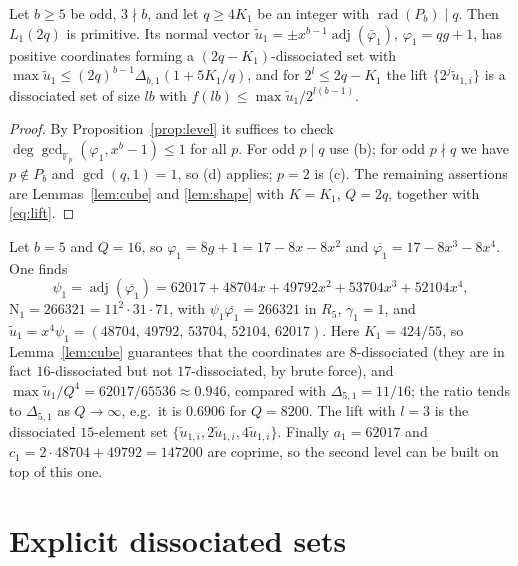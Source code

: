 \documentclass[12pt]{article}
\newcommand{\F}{\mathbb{F}}
\newcommand{\adj}{\operatorname{adj}}
\newcommand{\rad}{\operatorname{rad}}
\newcommand{\Nm}{\mathrm{N}}
\newcommand{\gpoly}{g}
\begin{document}
\begin{theorem}\label{thm:A}
Let $b\ge5$ be odd, $3\nmid b$, and let $q\ge4K_1$ be an integer with $\rad(P_b)\mid q$. Then $L_1(2q)$ is primitive.
Its normal vector $\tilde u_1=\pm x^{b-1}\adj(\bar\varphi_1)$, $\varphi_1=q\gpoly+1$, has positive coordinates forming a
$(2q-K_1)$-dissociated set with $\max\tilde u_1\le(2q)^{b-1}\Delta_{b,1}(1+5K_1/q)$, and for $2^l\le2q-K_1$ the lift
$\{2^j\tilde u_{1,i}\}$ is a dissociated set of size $lb$ with $f(lb)\le\max\tilde u_1/2^{l(b-1)}$.
\end{theorem}
\begin{proof}
By Proposition~\ref{prop:level} it suffices to check $\deg\gcd_{\F_p}(\varphi_1,x^b-1)\le1$ for all $p$. For odd $p\mid q$
use (b); for odd $p\nmid q$ we have $p\notin P_b$ and $\gcd(q,1)=1$, so (d) applies; $p=2$ is (c). The remaining assertions
are Lemmas~\ref{lem:cube} and \ref{lem:shape} with $K=K_1$, $Q=2q$, together with \eqref{eq:lift}.
\end{proof}

\begin{example}\label{ex:5}
Let $b=5$ and $Q=16$, so $\varphi_1=8\gpoly+1=17-8x-8x^2$ and $\overline{\varphi_1}=17-8x^3-8x^4$. One finds
\[
\psi_1=\adj(\overline{\varphi_1})=62017+48704x+49792x^2+53704x^3+52104x^4,
\]
$\Nm_1=266321=11^2\cdot31\cdot71$, with $\psi_1\overline{\varphi_1}=266321$ in $R_5$, $\gamma_1=1$, and
$\tilde u_1=x^4\psi_1=(48704,\,49792,\,53704,\,52104,\,62017)$. Here $K_1=424/55$, so Lemma~\ref{lem:cube} guarantees
that the coordinates are $8$-dissociated (they are in fact $16$-dissociated but not $17$-dissociated, by brute force), and
$\max\tilde u_1/Q^4=62017/65536\approx0.946$, compared with $\Delta_{5,1}=11/16$; the ratio tends to $\Delta_{5,1}$ as
$Q\to\infty$, e.g.\ it is $0.6906$ for $Q=8200$. The lift with $l=3$ is the dissociated $15$-element set
$\{\tilde u_{1,i},2\tilde u_{1,i},4\tilde u_{1,i}\}$. Finally $a_1=62017$ and $c_1=2\cdot48704+49792=147200$ are coprime,
so the second level can be built on top of this one.
\end{example}

\section{Explicit dissociated sets}\label{sec:main}
\end{document}
